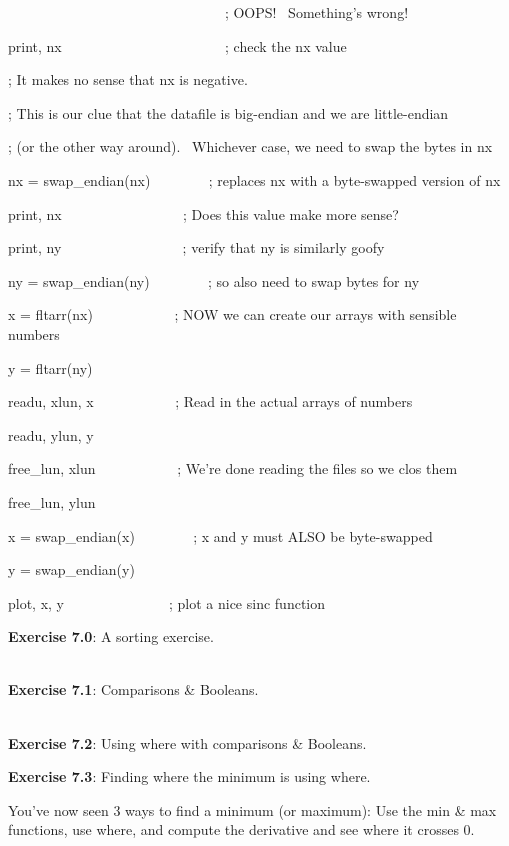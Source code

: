 \documentclass{article}
\begin{document}
\begin{spacing}{1.0}
~~ ~ ~ ~ ~ ~ ~ ~ ~ ~ ~ ~ ~ ~ ~ ~ ~ ~ ; OOPS!~ Something's wrong!

print, nx~ ~ ~ ~ ~ ~ ~ ~ ~ ~ ~ ~ ~ ~ ; check the nx value


; It makes no sense that nx is negative.

; This is our clue that the datafile is big-endian and we are
little-endian

; (or the other way around).~ Whichever case, we need to swap the bytes
in nx


nx = swap\_endian(nx)~ ~ ~ ~ ~ ; replaces nx with a byte-swapped version
of nx

print, nx ~ ~ ~ ~ ~ ~ ~ ~ ~ ~ ; Does this value make more sense?

print, ny ~ ~ ~ ~ ~ ~ ~ ~ ~ ~ ; verify that ny is similarly goofy

ny = swap\_endian(ny)~ ~ ~ ~ ~ ; so also need to swap bytes for ny


x = fltarr(nx)~ ~ ~ ~ ~ ~ ~ ; NOW we can create our arrays with sensible
numbers

y = fltarr(ny)

readu, xlun, x~ ~ ~ ~ ~ ~ ~ ; Read in the actual arrays of numbers

readu, ylun, y ~ ~ ~ ~ ~ ~ ~


free\_lun, xlun~ ~ ~ ~ ~ ~ ~ ; We're done reading the files so we clos
them

free\_lun, ylun


x = swap\_endian(x)~ ~ ~ ~ ~ ; x and y must ALSO be byte-swapped

y = swap\_endian(y)


plot, x, y~ ~ ~ ~ ~ ~ ~ ~ ~ ; plot a nice sinc function



\textbf{Exercise 7.0}: A sorting exercise.

\textbf{}\\

\textbf{Exercise 7.1}: Comparisons \& Booleans.

\textbf{}\\

\textbf{Exercise 7.2}: Using where with comparisons \& Booleans.

\textbf{Exercise 7.3}: Finding where the minimum is using where.

You've now seen 3 ways to find a minimum (or maximum): Use the min \&
max functions, use where, and compute the derivative and see where it
crosses 0.






\end{spacing}
\end{document}
